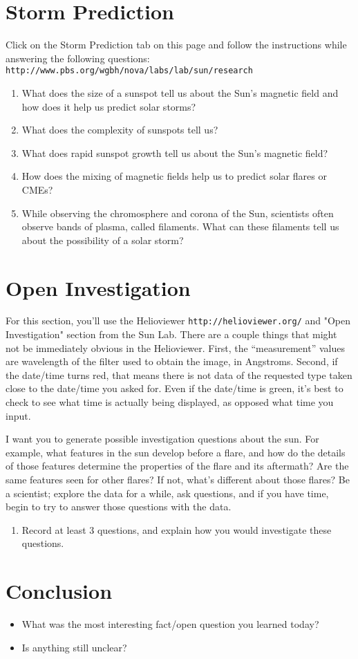 \documentclass[11pt]{article}%
\begin{document}
\section*{Storm Prediction}
Click on the Storm Prediction tab on this page and follow the instructions while answering the following questions: {\tt http://www.pbs.org/wgbh/nova/labs/lab/sun/research}
\begin{enumerate}
\item  What does the size of a sunspot tell us about the Sun's magnetic field and how does it help us predict solar storms?
\item  What does the complexity of sunspots tell us?
\item What does rapid sunspot growth tell us about the Sun's magnetic field?
\item  How does the mixing of magnetic fields help us to predict solar flares or CMEs?
\item While observing the chromosphere and corona of the Sun, scientists often observe bands of plasma, called filaments. What can these filaments tell us about the possibility of a solar storm?
\end{enumerate}


\section*{Open Investigation}
For this section, you'll use the Helioviewer {\tt http://helioviewer.org/} and "Open Investigation" section from the Sun Lab. 
There are a couple things that might not be immediately obvious in the Helioviewer. First, the ``measurement'' values are wavelength of the filter used to obtain the image, in Angstroms. Second, if the date/time turns red, that means there is not data of the requested type taken close to the date/time you asked for. Even if the date/time is green, it's best to check to see what time is actually being displayed, as opposed what time you input. 

I want you to generate possible investigation questions about the sun. For example, what features in the sun develop before a flare, and how do the details of those features determine the properties of the flare and its aftermath? Are the same features seen for other flares? If not, what's different about those flares? Be a scientist; explore the data for a while, ask questions, and if you have time, begin to try to answer those questions with the data.  \\
\begin{enumerate}
\item Record at least 3 questions, and explain how you would investigate these questions. 
\end{enumerate}
\section*{Conclusion}
\begin{itemize}
    \item What was the most interesting fact/open question you learned today?
    \item Is anything still unclear?
\end{itemize}
\end{document}
